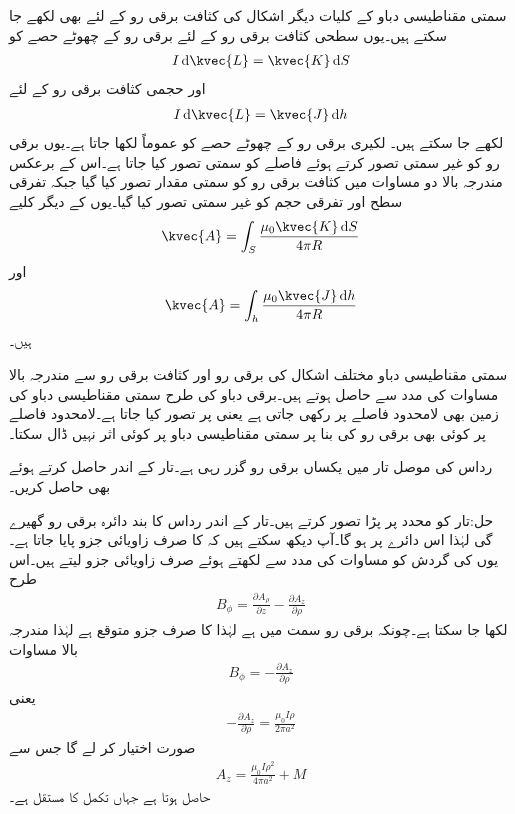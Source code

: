 سمتی مقناطیسی دباو  کے کلیات دیگر اشکال کی کثافت برقی رو کے لئے بھی لکھے جا سکتے ہیں۔یوں سطحی کثافت برقی رو  کے لئے  برقی رو کے چھوٹے حصے کو
\begin{align*}
I \dif \kvec{L}=\kvec{K} \dif S
\end{align*}
اور حجمی کثافت برقی رو  کے لئے
\begin{align*}
I \dif \kvec{L}=\kvec{J} \dif h
\end{align*}
لکھے جا سکتے ہیں۔ لکیری برقی رو کے چھوٹے حصے کو عموماً  لکھا جاتا ہے۔یوں برقی رو کو غیر سمتی تصور کرتے ہوئے فاصلے کو سمتی تصور کیا جاتا ہے۔اس کے برعکس مندرجہ بالا دو مساوات میں کثافت برقی رو کو سمتی مقدار تصور کیا گیا جبکہ تفرقی سطح  اور تفرقی حجم  کو غیر سمتی تصور کیا گیا۔یوں  کے دیگر کلیے 
\begin{align}
\kvec{A}=\int_S \frac{\mu_0 \kvec{K} \dif S}{4\pi R}
\end{align}
اور
\begin{align}\label{مساوات_مقناطیسی_سمتی_مقناطیسی_دباو_حجمی_رو}
\kvec{A}=\int_h \frac{\mu_0 \kvec{J} \dif h}{4\pi R}
\end{align}
ہیں۔ 

سمتی مقناطیسی دباو مختلف اشکال کی برقی رو اور کثافت برقی رو سے مندرجہ بالا مساوات کی مدد سے حاصل ہوتے ہیں۔برقی دباو کی طرح سمتی مقناطیسی دباو کی زمین بھی لامحدود فاصلے پر رکھی جاتی ہے یعنی  پر  تصور کیا جاتا ہے۔لامحدود فاصلے پر کوئی بھی برقی رو  کی بنا پر سمتی مقناطیسی دباو پر کوئی اثر نہیں ڈال سکتا۔

رداس  کی موصل تار میں یکساں برقی رو  گزر رہی ہے۔تار کے اندر  حاصل کرتے ہوئے  بھی حاصل کریں۔

حل:تار کو  محدد پر پڑا تصور کرتے ہیں۔تار کے اندر  رداس کا بند دائرہ  برقی رو گھیرے گی لہٰذا اس دائرے پر  ہو گا۔آپ دیکھ سکتے ہیں کہ  کا صرف زاویائی جزو پایا جاتا ہے۔یوں  کی گردش کو مساوات  کی مدد سے لکھتے ہوئے صرف زاویائی جزو لیتے ہیں۔اس طرح
\begin{align*}
B_{\phi}=\frac{\partial A_\rho}{\partial z}-\frac{\partial A_z}{\partial \rho}
\end{align*} 
لکھا جا سکتا ہے۔چونکہ برقی رو   سمت میں ہے لہٰذا  کا صرف  جزو متوقع ہے لہٰذا مندرجہ بالا مساوات 
\begin{align*}
B_{\phi}=-\frac{\partial A_z}{\partial \rho}
\end{align*} 
یعنی
\begin{align*}
-\frac{\partial A_z}{\partial \rho}=\frac{\mu_0 I \rho}{2\pi a^2}
\end{align*}
صورت  اختیار کر لے گا جس سے
\begin{align*}
A_z= \tfrac{\mu_0 I \rho^2 }{4\pi a^2} +M
\end{align*}
حاصل ہوتا ہے جہاں  تکمل کا مستقل ہے۔

